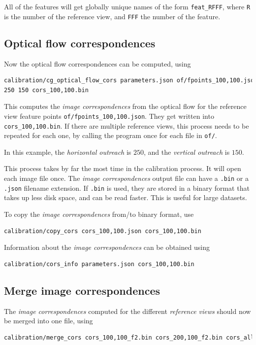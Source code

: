 \documentclass{scrreprt}
\begin{document}
All of the features will get globally unique names of the form \texttt{feat\_RFFF}, where \texttt{R} is the number of the reference view, and \texttt{FFF} the number of the feature.

\subsection{Optical flow correspondences}
Now the optical flow correspondences can be computed, using
\begin{lstlisting}[language=bash]
calibration/cg_optical_flow_cors parameters.json of/fpoints_100,100.json
250 150 cors_100,100.bin
\end{lstlisting}
This computes the \emph{image correspondences} from the optical flow for the reference view feature points \texttt{of/fpoints\_100,100.json}. They get written into \texttt{cors\_100,100.bin}. If there are multiple reference views, this process needs to be repeated for each one, by calling the program once for each file in \texttt{of/}.

In this example, the \emph{horizontal outreach} is $250$, and the \emph{vertical outreach} is $150$.

This process takes by far the most time in the calibration process. It will open each image file once. The \emph{image correspondences} output file can have a \texttt{.bin} or a \texttt{.json} filename extension. If \texttt{.bin} is used, they are stored in a binary format that takes up less disk space, and can be read faster. This is useful for large datasets.

\noindent To copy the \emph{image correspondences} from/to binary format, use
\begin{lstlisting}[language=bash]
calibration/copy_cors cors_100,100.json cors_100,100.bin
\end{lstlisting}

\noindent Information about the \emph{image correspondences} can be obtained using
\begin{lstlisting}[language=bash]
calibration/cors_info parameters.json cors_100,100.bin
\end{lstlisting}

\subsection{Merge image correspondences}
The \emph{image correspondences} computed for the different \emph{reference views} should now be merged into one file, using
\begin{lstlisting}[language=bash]
calibration/merge_cors cors_100,100_f2.bin cors_200,100_f2.bin cors_all.bin
\end{lstlisting}
\end{document}
